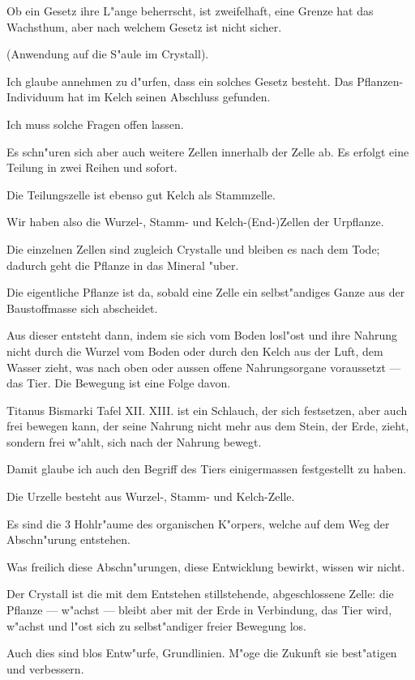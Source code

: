 \documentclass[a4paper, 11pt, oneside, german]{article}
\begin{document}
Ob ein Gesetz ihre L"ange beherrscht, ist zweifelhaft, eine Grenze hat das Wachsthum, aber nach welchem Gesetz ist nicht sicher.

(Anwendung auf die S"aule im Crystall).

Ich glaube annehmen zu d"urfen, dass ein solches Gesetz besteht. Das Pflanzen-Individuum hat im Kelch seinen Abschluss gefunden.

Ich muss solche Fragen offen lassen.

Es schn"uren sich aber auch weitere Zellen innerhalb der Zelle ab. Es erfolgt eine Teilung in zwei Reihen und sofort.

Die Teilungszelle ist ebenso gut Kelch als Stammzelle.

Wir haben also die Wurzel-, Stamm- und Kelch-(End-)Zellen der Urpflanze.

Die einzelnen Zellen sind zugleich Crystalle und bleiben es nach dem Tode; dadurch geht die Pflanze in das Mineral "uber.

Die eigentliche Pflanze ist da, sobald eine Zelle ein selbst"andiges Ganze aus der Baustoffmasse sich abscheidet.

Aus dieser entsteht dann, indem sie sich vom Boden losl"ost und ihre Nahrung nicht durch die Wurzel vom Boden oder durch den Kelch aus der Luft, dem Wasser zieht, was nach oben oder aussen offene Nahrungsorgane voraussetzt --- das Tier. Die Bewegung ist eine Folge davon.

Titanus Bismarki Tafel XII. XIII. ist ein Schlauch, der sich festsetzen, aber auch frei bewegen kann, der seine Nahrung nicht mehr aus dem Stein, der Erde, zieht, sondern frei w"ahlt, sich nach der Nahrung bewegt.

Damit glaube ich auch den Begriff des Tiers einigermassen festgestellt zu haben.

Die Urzelle besteht aus Wurzel-, Stamm- und Kelch-Zelle.

Es sind die 3 Hohlr"aume des organischen K"orpers, welche auf dem Weg der Abschn"urung entstehen.

Was freilich diese Abschn"urungen, diese Entwicklung bewirkt, wissen wir nicht.

Der Crystall ist die mit dem Entstehen stillstehende, abgeschlossene Zelle: die Pflanze --- w"achst --- bleibt aber mit der Erde in Verbindung, das Tier wird, w"achst und l"ost sich zu selbst"andiger freier Bewegung los.

Auch dies sind blos Entw"urfe, Grundlinien. M"oge die Zukunft sie best"atigen und verbessern.
\clearpage
\end{document}
